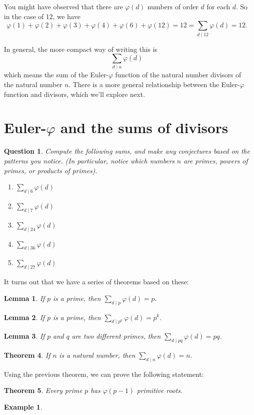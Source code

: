 \documentclass[12pt]{amsart}
\theoremstyle{plain}
\newtheorem{thm}{Theorem}
\newtheorem{lem}[thm]{Lemma}
\newtheorem{quest}{Question}
\theoremstyle{definition}
\newtheorem*{ex}{Example}
\theoremstyle{remark}
\begin{document}
\newpage
You might have observed that there are $\varphi(d)$ numbers of order $d$ for each $d$.  So in the case of 12, we have
$$\varphi(1) + \varphi(2) + \varphi(3) + \varphi(4) + \varphi(6) + \varphi(12) = 12 = \sum_{d \mid 12} \varphi(d) = 12.$$

In general, the more compact way of writing this is $$\sum_{d \mid n} \varphi(d)$$ which means the sum of the Euler-$\varphi$ function of the natural number divisors of the natural number $n$.  There is a more general relationship between the Euler-$\varphi$ function and divisors, which we'll explore next.

\section{Euler-$\varphi$ and the sums of divisors}
\begin{quest}
Compute the following sums, and make any conjectures based on the patterns you notice.  (In particular, notice which numbers $n$ are primes, powers of primes, or products of primes).
\begin{enumerate}[1.]
	\item $\displaystyle \sum_{d \mid 6} \varphi(d)$\\ \vspace{1.5in}
	\item $\displaystyle \sum_{d \mid 7} \varphi(d)$\\ \vspace{1.5in}
	\newpage\item $\displaystyle \sum_{d \mid 24} \varphi(d)$\\ \vspace{2in}
	\item $\displaystyle \sum_{d \mid 36} \varphi(d)$\\ \vspace{2in}
	\item $\displaystyle \sum_{d \mid 27} \varphi(d)$\\ \vspace{2in}
\end{enumerate}
\end{quest}

\newpage It turns out that we have a series of theorems based on these:
\begin{lem}
If $p$ is a prime, then $\displaystyle \sum_{d \mid p} \varphi(d) = p$.
\end{lem}
\begin{lem}
If $p$ is a prime, then $\displaystyle \sum_{d \mid {p^k}} \varphi(d) = p^k$.
\end{lem}
\begin{lem}
If $p$ and $q$ are two different primes, then $\displaystyle \sum_{d \mid pq} \varphi(d) = pq$.
\end{lem}
\begin{thm}
If $n$ is a natural number, then $\displaystyle \sum_{d \mid n} \varphi(d) = n$.
\end{thm}
Using the previous theorem, we can prove the following statement:
\begin{thm}
Every prime $p$ has $\varphi(p-1)$ primitive roots.
\end{thm}

\begin{ex}
\end{ex}
\end{document}
